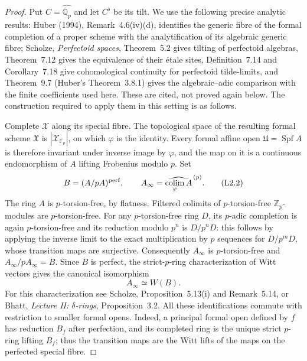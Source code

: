 \begin{proof}
Put $C=\widehat{\overline{\mathbb Q}_p}$ and let $C^\flat$ be its tilt.
We use the following precise analytic results: Huber (1994),
Remark~4.6(iv)(d), identifies the generic fibre of the formal completion
of a proper scheme with the analytification of its algebraic generic
fibre; Scholze, \emph{Perfectoid spaces}, Theorem~5.2 gives tilting of
perfectoid algebras, Theorem~7.12 gives the equivalence of their
\'etale sites, Definition~7.14 and Corollary~7.18 give cohomological
continuity for perfectoid tilde-limits, and Theorem~9.7 (Huber's
Theorem~3.8.1) gives the algebraic--adic comparison with the finite
coefficients used here.  These are cited, not proved again below.
The construction required to apply them in this setting is as follows.

Complete $\mathcal X$ along its special fibre.  The topological
space of the resulting formal scheme $\mathfrak X$ is
$|\mathcal X_{\mathbb F_p}|$, on which $\varphi$ is the identity.
Every formal affine open $\mathfrak U=\operatorname{Spf}A$ is
therefore invariant under inverse image by $\varphi$, and the map on
it is a continuous endomorphism of $A$ lifting Frobenius modulo $p$.
Set
\[
 B=(A/pA)^{\mathrm{perf}},\qquad
 A_\infty=\widehat{\mathop{\rm colim}_{\varphi} A}^{\,(p)}.
 \tag{L2.2}
\]
The ring $A$ is $p$-torsion-free, by flatness.  Filtered colimits of
$p$-torsion-free $\mathbb Z_p$-modules are $p$-torsion-free.  For any
$p$-torsion-free ring $D$, its $p$-adic completion is again
$p$-torsion-free and its reduction modulo $p^n$ is $D/p^nD$: this
follows by applying the inverse limit to the exact multiplication by
$p$ sequences for $D/p^mD$, whose transition maps are surjective.
Consequently $A_\infty$ is $p$-torsion-free and
$A_\infty/pA_\infty=B$.  Since $B$ is perfect, the strict-$p$-ring
characterization of Witt vectors gives the canonical isomorphism
\[
 A_\infty\simeq W(B).
 \tag{L2.3}
\]
For this characterization see Scholze, Proposition~5.13(i) and
Remark~5.14, or Bhatt, \emph{Lecture II: $\delta$-rings},
Proposition~3.2.  All these identifications commute with restriction
to smaller formal opens.  Indeed, a principal formal open defined by
$f$ has reduction $B_f$ after perfection, and its completed ring is
the unique strict $p$-ring lifting $B_f$; thus the transition maps are
the Witt lifts of the maps on the perfected special fibre.


\end{proof}
